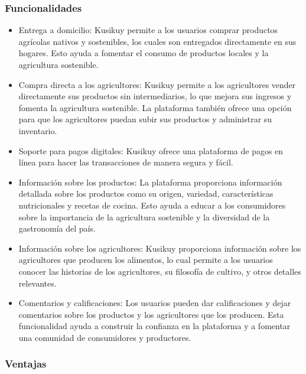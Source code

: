 \subsubsection{Funcionalidades}

\begin{itemize}

	\item Entrega a domicilio: Kusikuy permite a los usuarios comprar productos agrícolas nativos y sostenibles, los cuales son entregados directamente en sus hogares. Esto ayuda a fomentar el consumo de productos locales y la agricultura sostenible.

	\item Compra directa a los agricultores: Kusikuy permite a los agricultores vender directamente sus productos sin intermediarios, lo que mejora sus ingresos y fomenta la agricultura sostenible. La plataforma también ofrece una opción para que los agricultores puedan subir sus productos y administrar su inventario.

	\item Soporte para pagos digitales: Kusikuy ofrece una plataforma de pagos en línea para hacer las transacciones de manera segura y fácil.

	\item Información sobre los productos: La plataforma proporciona información detallada sobre los productos como su origen, variedad, características nutricionales y recetas de cocina. Esto ayuda a educar a los consumidores sobre la importancia de la agricultura sostenible y la diversidad de la gastronomía del país.

	\item Información sobre los agricultores: Kusikuy proporciona información sobre los agricultores que producen los alimentos, lo cual permite a los usuarios conocer las historias de los agricultores, su filosofía de cultivo, y otros detalles relevantes.

	\item Comentarios y calificaciones: Los usuarios pueden dar calificaciones y dejar comentarios sobre los productos y los agricultores que los producen. Esta funcionalidad ayuda a construir la confianza en la plataforma y a fomentar una comunidad de consumidores y productores.

\end{itemize}

\subsubsection{Ventajas}

